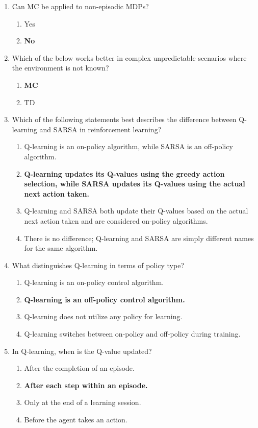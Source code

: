 \documentclass{report}
\numberwithin{equation}{section}
\begin{document}
\begin{enumerate}
    \item Can MC be applied to non-episodic MDPs?
    \begin{enumerate}[label=\alph*.]
        \item Yes
        \item \textbf{No}
    \end{enumerate}
    \item Which of the below works better in complex unpredictable scenarios where the environment is not known?
    \begin{enumerate}[label=\alph*.]
        \item \textbf{MC}
        \item TD
    \end{enumerate}
\item Which of the following statements best describes the difference between Q-learning and SARSA in reinforcement learning?
\begin{enumerate}[label=\alph*.]
    \item Q-learning is an on-policy algorithm, while SARSA is an off-policy algorithm.
    \item \textbf{Q-learning updates its Q-values using the greedy action selection, while SARSA updates its Q-values using the actual next action taken.}
    \item Q-learning and SARSA both update their Q-values based on the actual next action taken and are considered on-policy algorithms.
    \item There is no difference; Q-learning and SARSA are simply different names for the same algorithm.
\end{enumerate}

\item What distinguishes Q-learning in terms of policy type?
\begin{enumerate}[label=\alph*.]
    \item Q-learning is an on-policy control algorithm.
    \item \textbf{Q-learning is an off-policy control algorithm.}
    \item Q-learning does not utilize any policy for learning.
    \item Q-learning switches between on-policy and off-policy during training.
\end{enumerate}

\item In Q-learning, when is the Q-value updated?
\begin{enumerate}[label=\alph*.]
    \item After the completion of an episode.
    \item \textbf{After each step within an episode.}
    \item Only at the end of a learning session.
    \item Before the agent takes an action.
\end{enumerate}


\end{enumerate}
\end{document}

